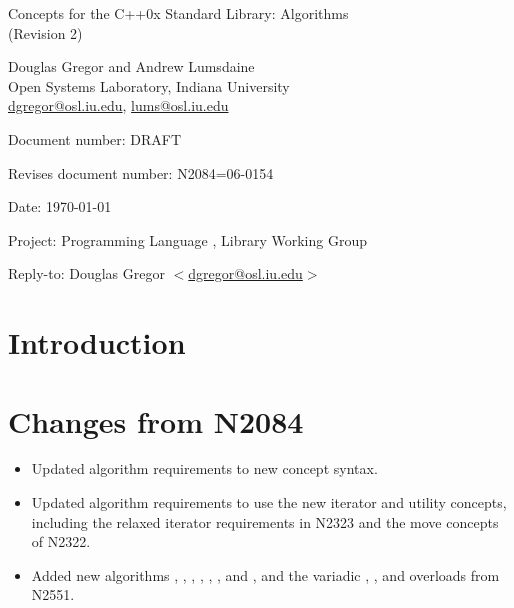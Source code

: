 \documentclass[american,twoside]{book}
\begin{document}
\raggedbottom

\begin{titlepage}
\begin{center}
\huge
Concepts for the C++0x Standard Library: Algorithms \\
(Revision 2)

\vspace{0.5in}

\normalsize
Douglas Gregor and Andrew Lumsdaine \\
Open Systems Laboratory, Indiana University \\
\href{mailto:dgregor@osl.iu.edu}{dgregor@osl.iu.edu}, \href{mailto:lums@osl.iu.edu}{lums@osl.iu.edu}
\end{center}

\vspace{1in}
\par\noindent Document number: DRAFT\vspace{-6pt}
\par\noindent Revises document number: N2084=06-0154\vspace{-6pt}
\par\noindent Date: \today\vspace{-6pt}
\par\noindent Project: Programming Language \Cpp{}, Library Working Group\vspace{-6pt}
\par\noindent Reply-to: Douglas Gregor $<$\href{mailto:dgregor@osl.iu.edu}{dgregor@osl.iu.edu}$>$\vspace{-6pt}

\section*{Introduction}
\section*{Changes from N2084}
\begin{itemize}
\item Updated algorithm requirements to new concept syntax.
\item Updated algorithm requirements to use the new iterator and
  utility concepts, including the relaxed iterator requirements in
  N2323 and the move concepts of N2322.
\item Added new algorithms , ,
  , , ,
  ,  and ,
  and the variadic , , and  overloads
  from N2551.
\end{itemize}

\end{titlepage}
\end{document}
